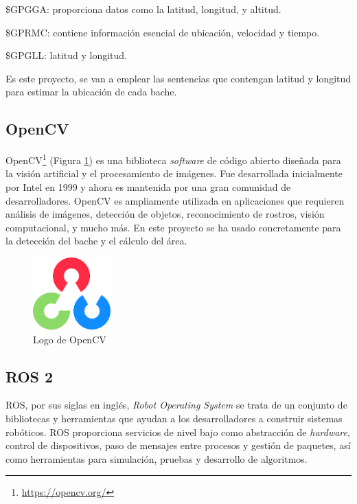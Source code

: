 \$GPGGA: proporciona datos como la latitud, longitud, y altitud.

\$GPRMC: contiene información esencial de ubicación, velocidad y tiempo.

\$GPGLL: latitud y longitud.

Es este proyecto, se van a emplear las sentencias que contengan latitud y longitud para estimar la ubicación de cada bache.

\subsection{OpenCV}
\label{subsec:opencv}

OpenCV\footnote{\url{https://opencv.org/}} (Figura \ref{fig:opencv}) es una biblioteca \textit{software} de código abierto diseñada para la visión artificial y el procesamiento de imágenes. Fue desarrollada inicialmente por Intel en 1999 y ahora es mantenida por una gran comunidad de desarrolladores. OpenCV es ampliamente utilizada en aplicaciones que requieren análisis de imágenes, detección de objetos, reconocimiento de rostros, visión computacional, y mucho más. En este proyecto se ha usado concretamente para la detección del bache y el cálculo del área.

\begin{figure} [h!]
	\begin{center}
		\includegraphics[width=3cm]{figs/opencv.png}
	\end{center}
	\caption{Logo de OpenCV} %
	\label{fig:opencv}
\end{figure}


\subsection{ROS 2}
\label{subsec:ros2}

ROS, por sus siglas en inglés, \textit{Robot Operating System} se trata de un conjunto de bibliotecas y herramientas que ayudan a los desarrolladores a construir sistemas robóticos. ROS proporciona servicios de nivel bajo como abstracción de \textit{hardware}, control de dispositivos, paso de mensajes entre procesos y gestión de paquetes, así como herramientas para simulación, pruebas y desarrollo de algoritmos.

